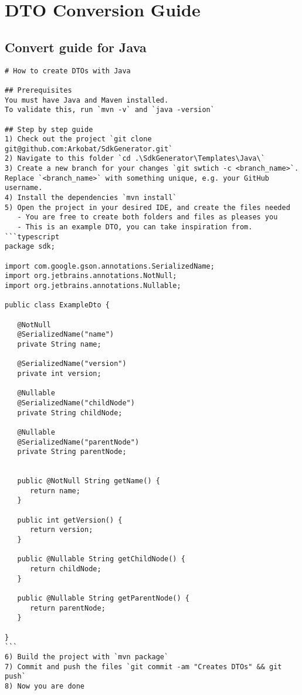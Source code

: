 \section{DTO Conversion Guide \label{appendix:convert_guide}}
\subsection{Convert guide for Java}
\begin{lstlisting}[caption={DTO conversion guide for Java}, label={code:convert_guide_java}, style=base]
# How to create DTOs with Java

## Prerequisites
You must have Java and Maven installed.
To validate this, run `mvn -v` and `java -version`

## Step by step guide
1) Check out the project `git clone git@github.com:Arkobat/SdkGenerator.git`
2) Navigate to this folder `cd .\SdkGenerator\Templates\Java\`
3) Create a new branch for your changes `git swtich -c <branch_name>`. Replace `<branch_name>` with something unique, e.g. your GitHub username.
4) Install the dependencies `mvn install`
5) Open the project in your desired IDE, and create the files needed
   - You are free to create both folders and files as pleases you
   - This is an example DTO, you can take inspiration from.
```typescript
package sdk;

import com.google.gson.annotations.SerializedName;
import org.jetbrains.annotations.NotNull;
import org.jetbrains.annotations.Nullable;

public class ExampleDto {

   @NotNull
   @SerializedName("name")
   private String name;

   @SerializedName("version")
   private int version;

   @Nullable
   @SerializedName("childNode")
   private String childNode;

   @Nullable
   @SerializedName("parentNode")
   private String parentNode;


   public @NotNull String getName() {
      return name;
   }

   public int getVersion() {
      return version;
   }

   public @Nullable String getChildNode() {
      return childNode;
   }

   public @Nullable String getParentNode() {
      return parentNode;
   }

}
```
6) Build the project with `mvn package`
7) Commit and push the files `git commit -am "Creates DTOs" && git push`
8) Now you are done
\end{lstlisting}
